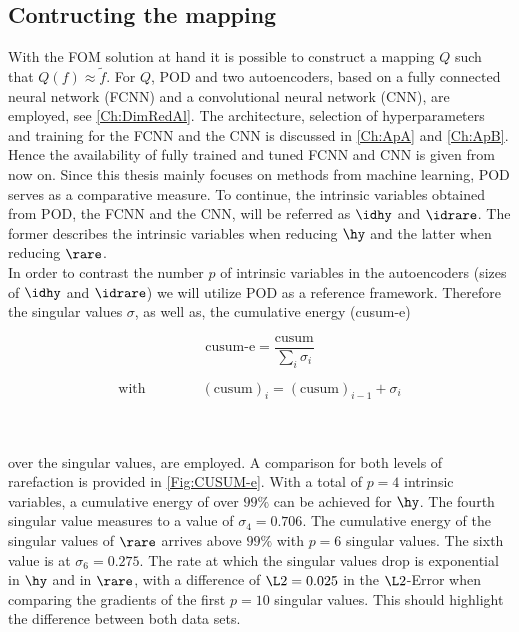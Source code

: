 \subsection{Contructing the mapping}
With the FOM solution at hand it is possible to construct a mapping \(Q\) such that \(Q(f)\approx \tilde{f}\). For \(Q\), POD and two autoencoders, based on a fully connected neural network (FCNN) and a convolutional neural network (CNN), are employed, see \cref{Ch:DimRedAl}. The architecture, selection of hyperparameters and training for the FCNN and the CNN is discussed in \cref{Ch:ApA} and \cref{Ch:ApB}. Hence the availability of fully trained and tuned FCNN and CNN is given from now on. Since this thesis mainly focuses on methods from machine learning, POD serves as a comparative measure. To continue, the intrinsic variables obtained from POD, the FCNN and the CNN, will be referred as \(\idhy\) and \(\idrare\). The former describes the intrinsic variables when reducing \(\hy\) and the latter when reducing \(\rare\).\\
In order to contrast the number \(p\) of intrinsic variables in the autoencoders (sizes of \(\idhy\) and \(\idrare\)) we will utilize POD as a reference framework. Therefore the singular values \(\sigma\), as well as, the cumulative energy (cusum-e)\\
\noindent \begin{minipage}{.3\linewidth}
	\begin{equation}
	\textrm{cusum-e} = \frac{\textrm{cusum}}{\sum_i \sigma_i}
	\end{equation}
\end{minipage}%
\begin{minipage}{.7\linewidth}
	\begin{equation}
			\textrm{with} \qquad\qquad(\textrm{cusum})_i =(\text{cusum})_{i-1} + \sigma_{i}
	\end{equation}
\end{minipage}\\\\
over the singular values, are employed. A comparison for both levels of rarefaction is provided in \cref{Fig:CUSUM-e}. With a total of \(p=4\) intrinsic variables, a cumulative energy of over \(99\%\) can be achieved for \(\hy\). The fourth singular value measures to a value of \(\sigma_4 = 0.706\). The cumulative energy of the singular values of \(\rare\) arrives above \(99\%\) with \(p=6\) singular values. The sixth value is at \(\sigma_6 = 0.275\). The rate at which the singular values drop is exponential in \(\hy\) and in \(\rare\), with a difference of \(\L2 = 0.025\) in the \(\L2\)-Error when comparing the gradients of the first \(p=10\) singular values. This should highlight the difference between both data sets.\\

